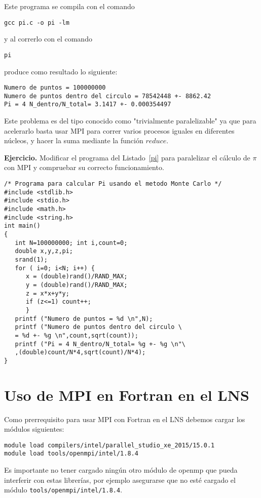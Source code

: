 \documentclass[letter]{jpconf}
\begin{document}
Este programa se compila con el comando
\color{blue}
\begin{verbatim}
gcc pi.c -o pi -lm
\end{verbatim}
\color{black}
y al correrlo con el comando 
\color{blue}
\begin{verbatim}
pi
\end{verbatim}
\color{black}
produce como resultado lo siguiente:
\color{brown}
\begin{verbatim}
Numero de puntos = 100000000 
Numero de puntos dentro del circulo = 78542448 +- 8862.42 
Pi = 4 N_dentro/N_total= 3.1417 +- 0.000354497 
\end{verbatim}
\color{black}

Este problema es del tipo conocido como "trivialmente paralelizable" ya que para acelerarlo basta usar MPI para correr varios procesos iguales en diferentes n\'ucleos, y 
hacer la suma mediante la funci\'on $reduce$. 

\textbf{Ejercicio.}  Modificar el programa del Listado~\ref{pi}  para paralelizar el c\'alculo de $\pi$ con MPI y compruebar su correcto funcionamiento.


\begin{lstlisting}[float,floatplacement=H,label=pi,caption=Listado del programa  secuencial que calcula $\pi$ en C.]
/* Programa para calcular Pi usando el metodo Monte Carlo */
#include <stdlib.h>
#include <stdio.h>
#include <math.h>
#include <string.h>
int main()
{
   int N=100000000; int i,count=0;
   double x,y,z,pi;
   srand(1);
   for ( i=0; i<N; i++) {
      x = (double)rand()/RAND_MAX;
      y = (double)rand()/RAND_MAX;
      z = x*x+y*y;
      if (z<=1) count++;
      }
   printf ("Numero de puntos = %d \n",N);
   printf ("Numero de puntos dentro del circulo \
   = %d +- %g \n",count,sqrt(count));
   printf ("Pi = 4 N_dentro/N_total= %g +- %g \n"\
   ,(double)count/N*4,sqrt(count)/N*4);
}
\end{lstlisting}



\section{\label{seccionFortran} Uso de MPI en Fortran en el LNS}

Como prerrequisito para usar MPI con Fortran en el LNS debemos cargar los m\'odulos siguientes:
\color{blue}
\begin{verbatim}
module load compilers/intel/parallel_studio_xe_2015/15.0.1
module load tools/openmpi/intel/1.8.4
\end{verbatim}
\color{black}
Es importante no tener cargado ning\'un otro m\'odulo de openmp que pueda interferir con estas librer\'ias, por ejemplo asegurarse que no est\'e cargado el m\'odulo 
\texttt{tools/openmpi/intel/1.8.4}.
\end{document}
